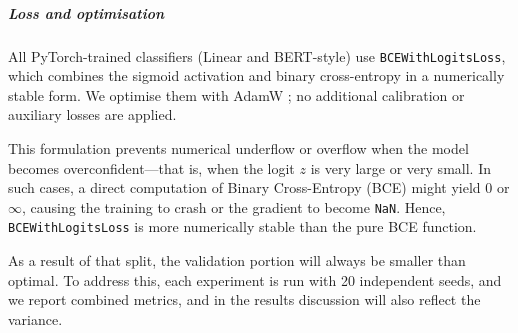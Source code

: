 \documentclass[12pt]{article}
\begin{document}
\subparagraph{Loss and optimisation}

All PyTorch-trained classifiers (Linear and BERT-style) use \texttt{BCEWithLogitsLoss}, which combines the sigmoid activation and binary cross-entropy in a numerically stable form.
We optimise them with AdamW \cite{paszke2019pytorch,loshchilov2019adamw}; no additional calibration or auxiliary losses are applied.

This formulation prevents numerical underflow or overflow when the model becomes overconfident\;---\;that is, when the logit $z$ is very large or very small. In such cases, a direct computation of Binary Cross-Entropy (BCE) might yield $0$ or $\infty$, causing the training to crash or the gradient to become \texttt{NaN}. Hence, \texttt{BCEWithLogitsLoss} is more numerically stable than the pure BCE function.


As a result of that split, the validation portion will always be smaller than optimal. To address this, each experiment is run with 20 independent seeds, and we report combined metrics, and in the results discussion will also reflect the variance.




\end{document}
